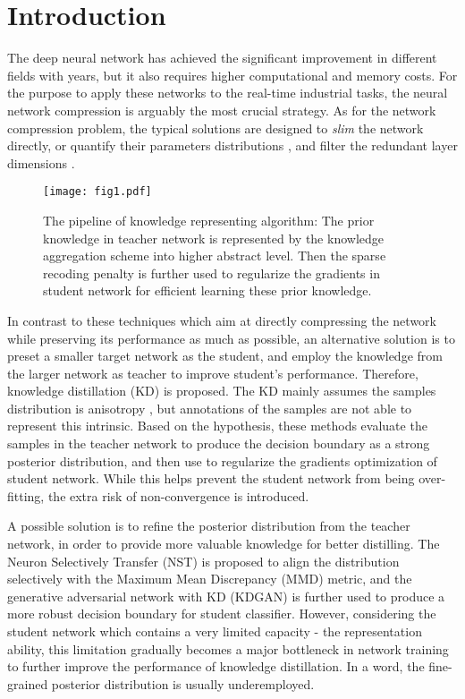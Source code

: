 \documentclass[10pt,twocolumn,letterpaper]{article}
\begin{document}
\section{Introduction}
The deep neural network has achieved the significant improvement
in different fields with years,
but it also requires higher computational and memory costs.
For the purpose to apply these networks to the real-time industrial tasks,
the neural network compression \cite{cheng2017survey} is arguably the most crucial strategy.
As for the network compression problem,
the typical solutions are designed
to \emph{slim} \cite{sandler2018mobilenetv2, zhang2018shufflenet} the network directly,
or quantify their
parameters distributions \cite{hubara2017quantized, jacob2018quantization, rastegari2016xnor},
and filter the
redundant layer dimensions \cite{he2017channel, thinet2017}.


\begin{figure}[t]
  \centering
  \texttt{[image: fig1.pdf]}
  \caption{The pipeline of knowledge representing algorithm: The prior knowledge in teacher network is represented by the knowledge aggregation scheme into higher abstract level. Then the sparse recoding penalty is further used to regularize the gradients in student network for efficient learning these prior knowledge.}
  \label{fig:KD}
\end{figure}

In contrast to these techniques
which aim at directly compressing the network
while preserving its performance as much as possible,
an alternative solution is to preset a smaller target network as the student,
and employ the knowledge from the larger network as teacher
to improve student's performance.
Therefore,
knowledge distillation \cite{Hinton2015Distilling} (KD) is proposed.
The KD mainly assumes the samples distribution is anisotropy \cite{balan2015bayesian},
but annotations of the samples are not able to represent this intrinsic.
Based on the hypothesis,
these methods evaluate the samples in the teacher network
to produce the decision boundary as a strong posterior distribution,
and then use to regularize the gradients optimization of student network.
While this helps prevent the student network from being over-fitting,
the extra risk of non-convergence is introduced.

A possible solution is to refine
the posterior distribution from the teacher network,
in order to provide more valuable knowledge for better distilling.
The Neuron Selectively Transfer (NST) \cite{huang2017like} is proposed to
align the distribution selectively with the Maximum Mean Discrepancy (MMD) metric,
and the generative adversarial network with KD (KDGAN) \cite{wang2018kdgan}
is further used to produce a more robust decision boundary for student classifier.
However,
considering the student network which contains a very limited capacity - the representation ability,
this limitation gradually becomes a major bottleneck in network training
to further improve the performance of knowledge distillation.
In a word,
the fine-grained posterior distribution is usually underemployed.
\end{document}
